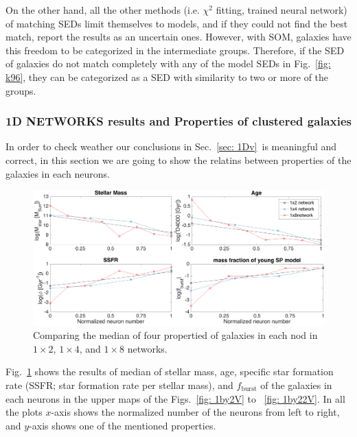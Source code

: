             On the other hand, all the other methods (i.e. $\chi^2$ fitting, trained neural network) of matching SEDs limit themselves to models, and if they could not find the best match, report the results as an uncertain ones.
            However, with SOM, galaxies have this freedom to be categorized in the intermediate groups.
            Therefore, if the SED of galaxies do not match completely with any of the model SEDs in Fig.~\ref{fig: k96}, they can be categorized as a SED with similarity to two or more of the groups.

                        
        
        
        \subsubsection{1D NETWORKS results and Properties of clustered galaxies}
        
        In order to check weather our conclusions in Sec.~\ref{sec: 1Dv}~is meaningful and correct, in this section we are going to show the relatins between properties of the galaxies in each neurons.
        
        \begin{figure}
            \centering
            \includegraphics[width=\textwidth]{../images0.01/1d/props4.png}
            \caption{Comparing the median of four propertied of galaxies in each nod in $1\times2$, $1\times4$, and $1\times8$ networks.}
            \label{fig: props}
        \end{figure}
       
        Fig.~\ref{fig: props} shows the results of median of stellar mass, age, specific star formation rate (SSFR; star formation rate per stellar mass), and $f_\mathrm{burst}$ of the galaxies in each neurons in the upper maps of the Figs.~\ref{fig: 1by2V} to ~\ref{fig: 1by22V}.
        In all the plots $x$-axis shows the normalized number of the neurons from left to right, and $y$-axis shows one of the mentioned properties.
        
